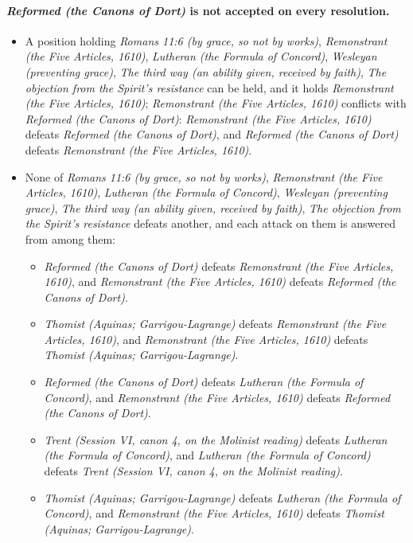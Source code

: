 \documentclass[11pt]{article}
\begin{document}
\paragraph{\emph{Reformed (the Canons of Dort)} is not accepted on every resolution.}
\begin{itemize}
\item A position holding \emph{Romans 11:6 (by grace, so not by works)}, \emph{Remonstrant (the Five Articles, 1610)}, \emph{Lutheran (the Formula of Concord)}, \emph{Wesleyan (preventing grace)}, \emph{The third way (an ability given, received by faith)}, \emph{The objection from the Spirit’s resistance} can be held, and it holds \emph{Remonstrant (the Five Articles, 1610)}; \emph{Remonstrant (the Five Articles, 1610)} conflicts with \emph{Reformed (the Canons of Dort)}: \emph{Remonstrant (the Five Articles, 1610)} defeats \emph{Reformed (the Canons of Dort)}, and \emph{Reformed (the Canons of Dort)} defeats \emph{Remonstrant (the Five Articles, 1610)}.
\item None of \emph{Romans 11:6 (by grace, so not by works)}, \emph{Remonstrant (the Five Articles, 1610)}, \emph{Lutheran (the Formula of Concord)}, \emph{Wesleyan (preventing grace)}, \emph{The third way (an ability given, received by faith)}, \emph{The objection from the Spirit’s resistance} defeats another, and each attack on them is answered from among them:
\begin{itemize}
\item \emph{Reformed (the Canons of Dort)} defeats \emph{Remonstrant (the Five Articles, 1610)}, and \emph{Remonstrant (the Five Articles, 1610)} defeats \emph{Reformed (the Canons of Dort)}.
\item \emph{Thomist (Aquinas; Garrigou-Lagrange)} defeats \emph{Remonstrant (the Five Articles, 1610)}, and \emph{Remonstrant (the Five Articles, 1610)} defeats \emph{Thomist (Aquinas; Garrigou-Lagrange)}.
\item \emph{Reformed (the Canons of Dort)} defeats \emph{Lutheran (the Formula of Concord)}, and \emph{Remonstrant (the Five Articles, 1610)} defeats \emph{Reformed (the Canons of Dort)}.
\item \emph{Trent (Session VI, canon 4, on the Molinist reading)} defeats \emph{Lutheran (the Formula of Concord)}, and \emph{Lutheran (the Formula of Concord)} defeats \emph{Trent (Session VI, canon 4, on the Molinist reading)}.
\item \emph{Thomist (Aquinas; Garrigou-Lagrange)} defeats \emph{Lutheran (the Formula of Concord)}, and \emph{Remonstrant (the Five Articles, 1610)} defeats \emph{Thomist (Aquinas; Garrigou-Lagrange)}.

\end{itemize}
\end{itemize}
\end{document}
